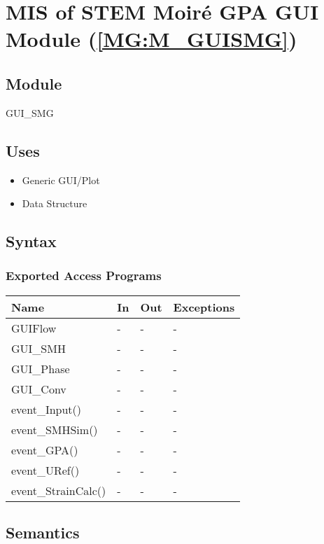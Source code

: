 \documentclass[12pt, titlepage]{article}
\begin{document}
\section{MIS of STEM Moir{\'e} GPA GUI Module (\texorpdfstring{\cref{MG:M_GUISMG}}))} \label{MIS_GUISMG}

\subsection{Module}
GUI{\_}SMG
\subsection{Uses}
\begin{itemize}
\item Generic GUI/Plot
\item Data Structure
\end{itemize}

\subsection{Syntax}

\subsubsection{Exported Access Programs}

\begin{center}
\begin{tabular}{p{4cm} p{2cm} p{2cm} p{2cm}}
\hline
\textbf{Name} & \textbf{In} & \textbf{Out} & \textbf{Exceptions} \\
\hline
GUIFlow & - & - & - \\
GUI{\_}SMH & - & - & - \\
GUI{\_}Phase & - & - & - \\
GUI{\_}Conv & - & - & - \\
event{\_}Input() & - & - & - \\
event{\_}SMHSim() & - & - & - \\
event{\_}GPA() & - & - & - \\
event{\_}URef() & - & - & - \\
event{\_}StrainCalc() & - & - & - \\
\hline
\end{tabular}
\end{center}

\subsection{Semantics}
\end{document}
